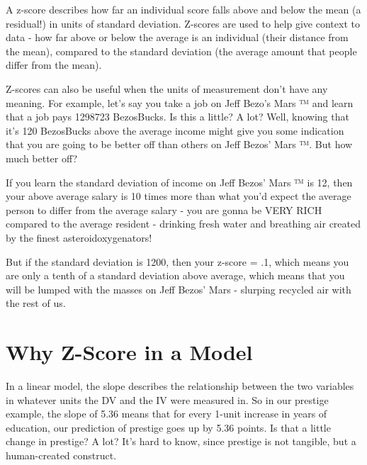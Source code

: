 \documentclass[
  letterpaper,
  DIV=11,
  numbers=noendperiod,
  oneside]{scrreprt}
\begin{document}
\begin{tcolorbox}[enhanced jigsaw, toptitle=1mm, toprule=.15mm, rightrule=.15mm, breakable, left=2mm, colbacktitle=quarto-callout-warning-color!10!white, colback=white, opacityback=0, coltitle=black, bottomtitle=1mm, opacitybacktitle=0.6, titlerule=0mm, leftrule=.75mm, arc=.35mm, bottomrule=.15mm, title=\textcolor{quarto-callout-warning-color}{\faExclamationTriangle}\hspace{0.5em}{RECAP : Uhhh\ldots can you re-explain Z-Scoring Professor???}, colframe=quarto-callout-warning-color-frame]

A z-score describes how far an individual score falls above and below
the mean (a residual!) in units of standard deviation. Z-scores are used
to help give context to data - how far above or below the average is an
individual (their distance from the mean), compared to the standard
deviation (the average amount that people differ from the mean).

Z-scores can also be useful when the units of measurement don't have any
meaning. For example, let's say you take a job on Jeff Bezo's Mars ™ and
learn that a job pays 1298723 BezosBucks. Is this a little? A lot? Well,
knowing that it's 120 BezosBucks above the average income might give you
some indication that you are going to be better off than others on Jeff
Bezos' Mars ™. But how much better off?

If you learn the standard deviation of income on Jeff Bezos' Mars ™ is
12, then your above average salary is 10 times more than what you'd
expect the average person to differ from the average salary - you are
gonna be VERY RICH compared to the average resident - drinking fresh
water and breathing air created by the finest asteroidoxygenators!

But if the standard deviation is 1200, then your z-score = .1, which
means you are only a tenth of a standard deviation above average, which
means that you will be lumped with the masses on Jeff Bezos' Mars -
slurping recycled air with the rest of us.

\end{tcolorbox}

\section{Why Z-Score in a Model}\label{why-z-score-in-a-model}

In a linear model, the slope describes the relationship between the two
variables in whatever units the DV and the IV were measured in. So in
our prestige example, the slope of 5.36 means that for every 1-unit
increase in years of education, our prediction of prestige goes up by
5.36 points. Is that a little change in prestige? A lot? It's hard to
know, since prestige is not tangible, but a human-created construct.
\end{document}
